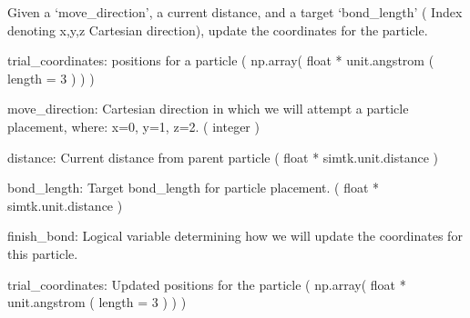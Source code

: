 \documentclass[letterpaper,12pt,english,openany,oneside]{sphinxmanual}
\begin{document}
\begin{fulllineitems}
\label{\detokenize{utilities:utilities.util.get_move}}
Given a ‘move\_direction’, a current distance, and a
target ‘bond\_length’ ( Index denoting x,y,z Cartesian 
direction), update the coordinates for the particle.

trial\_coordinates: positions for a particle
( np.array( float * unit.angstrom ( length = 3 ) ) )

move\_direction: Cartesian direction in which we will
attempt a particle placement, where: x=0, y=1, z=2. 
( integer )

distance: Current distance from parent particle
( float * simtk.unit.distance )

bond\_length: Target bond\_length for particle placement.
( float * simtk.unit.distance )

finish\_bond: Logical variable determining how we will
update the coordinates for this particle.

trial\_coordinates: Updated positions for the particle
( np.array( float * unit.angstrom ( length = 3 ) ) )

\end{fulllineitems}

\end{document}
